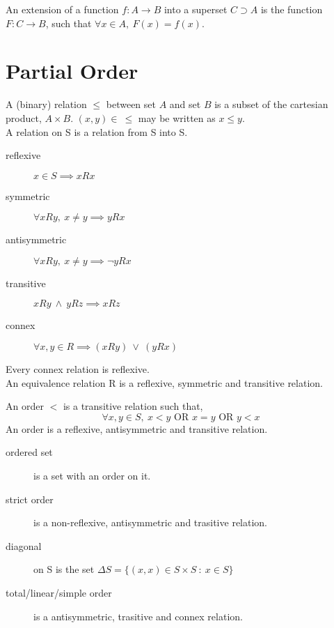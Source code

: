 	\begin{definition}
		An extension of a function $f:A \to B$ into a superset $C \supset A$ is the function $F:C \to B$, such that $\forall x \in A,\ F(x)=f(x)$.
	\end{definition}

\section{Partial Order}
	\begin{definition}
		A (binary) relation $\leq$ between set $A$ and set $B$
		is a subset of the cartesian product, $A \times B$.
		$(x,y) \in\ \leq $ may be written as $x \leq y$.\\
		A relation on S is a relation from S into S.
	\end{definition}
	\begin{description}
		\item[reflexive] $x \in S \implies xRx $
		\item[symmetric] $\forall xRy,\ x \neq y \implies yRx$
		\item[antisymmetric] $\forall xRy,\ x \neq y \implies \neg yRx$
		\item[transitive] $xRy\ \wedge \ yRz \implies xRz$
		\item[connex] $\forall x,y \in R \implies (xRy)\ \vee \ (yRx)$
	\end{description}
	\begin{remark}
		Every connex relation is reflexive.\\
		An equivalence relation R is a reflexive, symmetric and transitive relation.
	\end{remark}
	\begin{definition}
		An order $<$ is a transitive relation such that, 
		$$\forall x,y \in S,\ x < y \text{ OR } x = y \text{ OR } y < x$$
		An  order is a reflexive, antisymmetric and transitive relation.
	\end{definition}
	\begin{description}
		\item[ordered set] is a set with an order on it.
		\item[strict order] is a non-reflexive, antisymmetric and trasitive relation.
		\item[diagonal] on S is the set $\Delta S = \{ (x,x) \in S \times S\ :\ x \in S\}$
		\item[total/linear/simple order] is a antisymmetric, trasitive and connex relation.
	\end{description}

